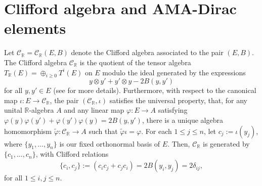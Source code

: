 \documentclass[10pt,a4paper]{amsart}
\numberwithin{equation}{section}
\newcommand{\bbr}{\mathbb{R}}
\begin{document}
\section{Clifford algebra and AMA-Dirac elements}\label{s:Cliff}
Let $\mathcal{C}_\bbr = \mathcal{C}_\bbr(E,B)$ denote the Clifford algebra associated to the pair $(E,B)$.
The Clifford algebra $\mathcal{C}_\bbr$ is the quotient of the tensor algebra $T_\bbr(E) = \oplus_{i\geq 0} T^i(E)$ on $E$ modulo the ideal generated by
the expressions
\[y\otimes y' + y'\otimes y - 2 B(y,y')\]
for all $y,y'\in E$ (see \cite{M76} for more details). Furthermore, with respect to the canonical map $\iota\colon E\to\mathcal{C}_\bbr$, the pair $(\mathcal{C}_\bbr,\iota)$ satisfies the universal property, that, for any unital $\mathbb{R}$-algebra $A$ and any linear map $\varphi\colon E\to A$ satisfying $\varphi(y)\varphi(y') + \varphi(y')\varphi(y) = 2B(y,y')$, there is a unique algebra homomorphism $\tilde\varphi\colon \mathcal{C}_\bbr\to A$ such that $\tilde\varphi\iota = \varphi.$ For each $1\leq j \leq n$, let $c_j := \iota(y_j)$, where $\{y_1,\dots,y_n\}$ is our fixed orthonormal basis of $E$. Then, $\mathcal{C}_\bbr$ is generated by $\{c_1,\dots,c_n\}$, with Clifford relations
\begin{equation}\label{e:CliffRel}
 \{c_i,c_j\} := (c_ic_j + c_jc_i) = 2B(y_i,y_j) = 2\delta_{ij},
\end{equation}
for all $1\leq i,j\leq n$.
\end{document}
